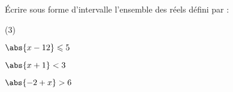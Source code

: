 \begin{exr}
\'Ecrire sous forme d'intervalle l'ensemble des réels défini par :
    \begin{enumerate-}(3)
    \item $\abs{x-12}\leqslant 5$
    \item $\abs{x+1}< 3$
    \item $\abs{-2+x}> 6$
    \end{enumerate-}
\end{exr}
%
%
%
%
%
%
%

